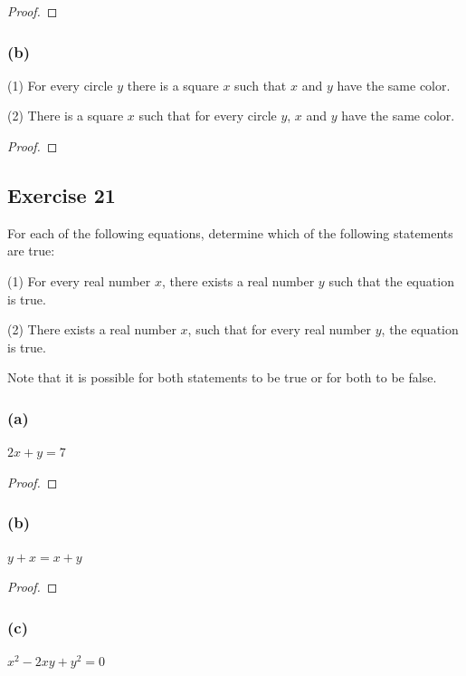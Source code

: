\documentclass[14pt]{extarticle}
\begin{document}
\begin{proof}

\end{proof}

\subsubsection{(b)}
(1) For every circle $y$ there is a square $x$ such that $x$ and $y$ have the same color.

(2) There is a square $x$ such that for every circle $y$, $x$ and $y$ have the same color.

\begin{proof}

\end{proof}

\subsection{Exercise 21}
For each of the following equations, determine which of the following statements are true:

(1) For every real number $x$, there exists a real number $y$ such that the equation is true.

(2) There exists a real number $x$, such that for every real number $y$, the equation is true.

Note that it is possible for both statements to be true or for both to be false.

\subsubsection{(a)}
$2x + y = 7$

\begin{proof}

\end{proof}

\subsubsection{(b)}
$y + x = x + y$

\begin{proof}

\end{proof}

\subsubsection{(c)}
$x^2 - 2xy + y^2 = 0$
\end{document}
